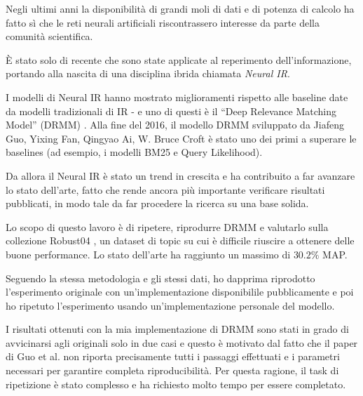 Negli ultimi anni la disponibilità di grandi moli di dati e di potenza di calcolo ha fatto sì che le reti neurali artificiali riscontrassero interesse da parte della comunità scientifica.

È stato solo di recente che sono state applicate al reperimento dell'informazione, portando alla nascita di una disciplina ibrida chiamata \textit{Neural IR}.

I modelli di Neural IR hanno mostrato miglioramenti rispetto alle baseline date da modelli tradizionali di IR - e uno di questi è il ``Deep Relevance Matching Model'' (DRMM) \cite{drmm}. Alla fine del 2016, il modello DRMM sviluppato da  Jiafeng Guo, Yixing Fan, Qingyao Ai, W. Bruce Croft è stato uno dei primi a superare le baselines (ad esempio, i modelli BM25 e Query Likelihood).

Da allora il Neural IR è stato un trend in crescita e ha contribuito a far avanzare lo stato dell'arte, fatto che rende ancora più importante verificare risultati pubblicati, in modo tale da far procedere la ricerca su una base solida.

Lo scopo di questo lavoro è di ripetere, riprodurre DRMM e valutarlo sulla collezione Robust04 \cite{rob04}, un dataset di topic su cui è difficile riuscire a ottenere delle buone performance. Lo stato dell'arte ha raggiunto un massimo di $30.2 \%$ MAP.

Seguendo la stessa metodologia e gli stessi dati, ho dapprima riprodotto l'esperimento originale con un'implementazione disponibilile pubblicamente e poi ho ripetuto l'esperimento usando un'implementazione personale del modello.

I risultati ottenuti con la mia implementazione di DRMM sono stati in grado di avvicinarsi agli originali solo in due casi e questo è motivato dal fatto che il paper di Guo et al. non
riporta precisamente tutti i passaggi effettuati e i parametri necessari per garantire completa riproducibilità. Per questa ragione, il task di ripetizione è stato complesso e ha richiesto molto tempo per essere completato.
